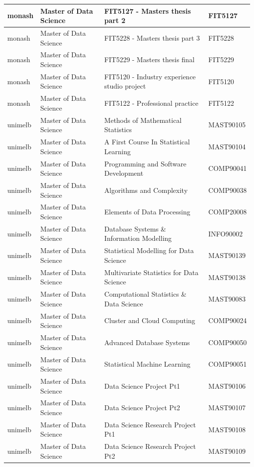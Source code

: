 \documentclass[
  letterpaper,
  DIV=11,
  numbers=noendperiod]{scrreport}
\begin{document}
\begin{table}
\begin{tabular}{l|l|l|l}
\hline
monash & Master of Data Science & FIT5127 - Masters thesis part 2 & FIT5127\\
\hline
monash & Master of Data Science & FIT5228 - Masters thesis part 3 & FIT5228\\
\hline
monash & Master of Data Science & FIT5229 - Masters thesis final & FIT5229\\
\hline
monash & Master of Data Science & FIT5120 - Industry experience studio project & FIT5120\\
\hline
monash & Master of Data Science & FIT5122 - Professional practice & FIT5122\\
\hline
unimelb & Master of Data Science & Methods of Mathematical Statistics & MAST90105\\
\hline
unimelb & Master of Data Science & A First Course In Statistical Learning & MAST90104\\
\hline
unimelb & Master of Data Science & Programming and Software Development & COMP90041\\
\hline
unimelb & Master of Data Science & Algorithms and Complexity & COMP90038\\
\hline
unimelb & Master of Data Science & Elements of Data Processing & COMP20008\\
\hline
unimelb & Master of Data Science & Database Systems \& Information Modelling & INFO90002\\
\hline
unimelb & Master of Data Science & Statistical Modelling for Data Science & MAST90139\\
\hline
unimelb & Master of Data Science & Multivariate Statistics for Data Science & MAST90138\\
\hline
unimelb & Master of Data Science & Computational Statistics \& Data Science & MAST90083\\
\hline
unimelb & Master of Data Science & Cluster and Cloud Computing & COMP90024\\
\hline
unimelb & Master of Data Science & Advanced Database Systems & COMP90050\\
\hline
unimelb & Master of Data Science & Statistical Machine Learning & COMP90051\\
\hline
unimelb & Master of Data Science & Data Science Project Pt1 & MAST90106\\
\hline
unimelb & Master of Data Science & Data Science Project Pt2 & MAST90107\\
\hline
unimelb & Master of Data Science & Data Science Research Project Pt1 & MAST90108\\
\hline
unimelb & Master of Data Science & Data Science Research Project Pt2 & MAST90109\\

\end{tabular}
\end{table}
\end{document}
